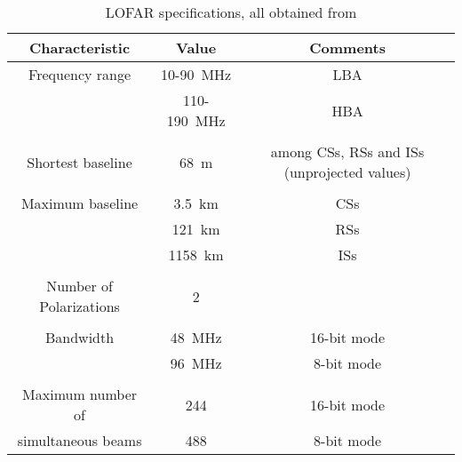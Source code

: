 \documentclass[../main/thesis_msc.tex]{subfiles}
\begin{document}
\begin{table}[t]
        \centering
        \begin{tabular}{ccc}
            \toprule
            \textbf{Characteristic} & \textbf{Value} & \textbf{Comments} \\ \midrule
            Frequency range & 10-90~MHz & LBA \\
                                        & 110-190~MHz & HBA \\ \\
            Shortest baseline & 68~m & among CSs, RSs and ISs (unprojected values) \\ \\
            Maximum baseline & 3.5~km & CSs \\
                                         & 121~km & RSs \\
                                         & 1158~km & ISs \\ \\
            Number of Polarizations & 2 & \\ \\
            Bandwidth & 48~MHz & 16-bit mode \\
                          & 96~MHz & 8-bit mode \\ \\
            Maximum number of & 244 & 16-bit mode\\
            simultaneous beams & 488 & 8-bit mode\\
            \bottomrule
        \end{tabular}
        \caption{LOFAR specifications, all obtained from \citep{LOFAR}}
        \label{lofar_specs}
    \end{table}
    
\end{document}
